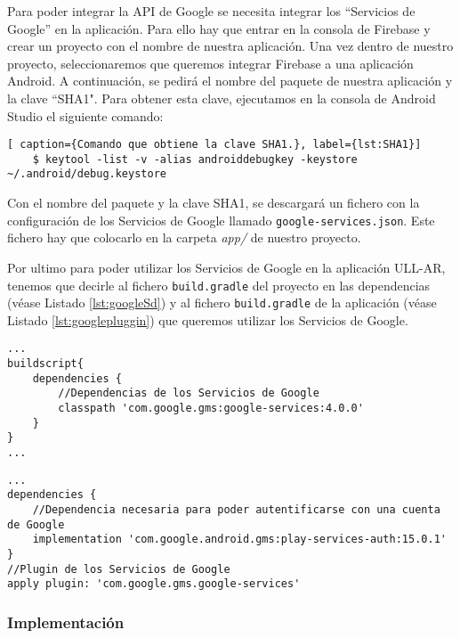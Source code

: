 Para poder integrar la API de Google se necesita integrar los ``Servicios de Google'' en la aplicación. Para ello hay que entrar en la consola de Firebase \cite{URL::Firebase} y crear un proyecto con el nombre de nuestra aplicación. Una vez dentro de nuestro proyecto, seleccionaremos que queremos integrar Firebase a una aplicación Android. A continuación, se  pedirá el nombre del paquete de nuestra aplicación y la clave ``SHA1". Para obtener esta clave, ejecutamos en la consola de Android Studio el siguiente comando: 
 
\begin{lstlisting}[ caption={Comando que obtiene la clave SHA1.}, label={lst:SHA1}]
    $ keytool -list -v -alias androiddebugkey -keystore ~/.android/debug.keystore
\end{lstlisting} 

Con el nombre del paquete y la clave SHA1, se descargará un fichero  con la configuración de los Servicios de Google llamado \texttt{google-services.json}. Este fichero hay que colocarlo en la carpeta \textit{app/} de nuestro proyecto.
 
Por ultimo para poder utilizar los Servicios de Google en la aplicación ULL-AR, tenemos que decirle al fichero \texttt{build.gradle} del proyecto en las dependencias (véase Listado \ref{lst:googleSd}) y al fichero \texttt{build.gradle} de la aplicación (véase Listado \ref{lst:googlepluggin}) que queremos utilizar  los Servicios de Google.

\begin{lstlisting}[caption={Fichero \texttt{build.gradle} del proyecto, dependencias para utilizar los Servicios de Google.}, label={lst:googleSd}]
...
buildscript{
    dependencies {
        //Dependencias de los Servicios de Google
        classpath 'com.google.gms:google-services:4.0.0'
    }   
} 
...
\end{lstlisting}
 
\begin{lstlisting}[caption={Fichero \texttt{build.gradle} de la aplicación, dependencias y plugin para utilizar los Servicios de Google.}, label={lst:googlepluggin}]
...
dependencies {
    //Dependencia necesaria para poder autentificarse con una cuenta de Google
    implementation 'com.google.android.gms:play-services-auth:15.0.1'
}
//Plugin de los Servicios de Google
apply plugin: 'com.google.gms.google-services'
\end{lstlisting}

\subsubsection{ Implementación }

